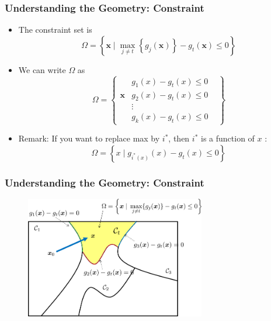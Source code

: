 \documentclass[8pt,dvipsnames]{beamer}
\begin{document}
\begin{frame}
	\frametitle{Understanding the Geometry: Constraint}
	\begin{itemize}
		\item The constraint set is
		$$
		\Omega=\left\{\boldsymbol{x} \mid \max _{j \neq t}\left\{g_{j}(\boldsymbol{x})\right\}-g_{t}(\boldsymbol{x}) \leq 0\right\}
		$$
		\item We can write \(\Omega\) as 
		$$
		\Omega=\left\{\begin{array}{c|cc} & g_{1}(x)-g_{t}(x) \leq 0 \\ \boldsymbol{x} & g_{2}(x)-g_{t}(x) \leq 0 \\  &\vdots & \\ & g_{k}(x)-g_{t}(x)  \leq 0\end{array}\right\}
		$$
		\item Remark: If you want to replace max by \(i^{*}\), then \(i^{*}\) is a function of \(x\) :
		$$
		\Omega=\left\{x \mid g_{i^{*}(x)}(x)-g_{t}(x) \leq 0\right\}
		$$
	\end{itemize}
\end{frame}

\begin{frame}
	\frametitle{Understanding the Geometry: Constraint}
	\begin{figure}[htbp]
		\centering
		\includegraphics[width=0.7\textwidth]{imgs/adv_overview_15.png}
	\end{figure}
\end{frame}
\end{document}
